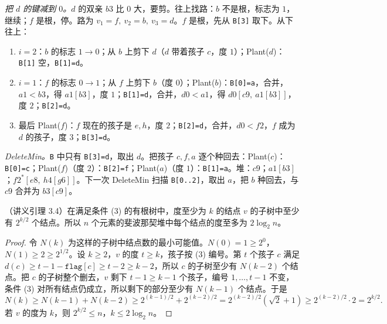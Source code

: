 \begin{example}
\emph{把 $d$ 的键减到 $0$。}$d$ 的双亲 $b3$ 比 $0$ 大，要剪。往上找路：$b$ 不是根，标志为 $1$，继续；$f$ 是根，停。路为 $v_1=f,\ v_2=b,\ v_3=d$。$f$ 是根，先从 \texttt{B[3]} 取下。从下往上：
\begin{enumerate}
\item $i=2$：$b$ 的标志 $1\to0$；从 $b$ 上剪下 $d$（$d$ 带着孩子 $c$，度 $1$）；Plant($d$)：\texttt{B[1]} 空，\texttt{B[1]=d}。
\item $i=1$：$f$ 的标志 $0\to1$；从 $f$ 上剪下 $b$（度 $0$）；Plant($b$)：\texttt{B[0]=a}，合并，$a1<b3$，得 $a1[b3]$，度 $1$；\texttt{B[1]=d}，合并，$d0<a1$，得 $d0[c9,\ a1[b3]]$，度 $2$；\texttt{B[2]=d}。
\item 最后 Plant($f$)：$f$ 现在的孩子是 $e,h$，度 $2$；\texttt{B[2]=d}，合并，$d0<f2$，$f$ 成为 $d$ 的孩子，度 $3$；\texttt{B[3]=d}。
\end{enumerate}
\begin{center}
\end{center}

\emph{DeleteMin。}\texttt{B} 中只有 \texttt{B[3]=d}，取出 $d$。把孩子 $c,f,a$ 逐个种回去：Plant($c$)：\texttt{B[0]=c}；Plant($f$)（度 $2$）：\texttt{B[2]=f}；Plant($a$)（度 $1$）：\texttt{B[1]=a}。堆：$c9$；$a1[b3]$；$f2^*[e8,\ h4[g6]]$。下一次 DeleteMin 扫描 \texttt{B[0..2]}，取出 $a$，把 $b$ 种回去，与 $c9$ 合并为 $b3[c9]$。
\end{example}


\begin{lemma}[度数引理]\label{lem:mst-prim:degree}
（讲义引理 3.4）在满足条件 (3) 的有根树中，度至少为 $k$ 的结点 $v$ 的子树中至少有 $2^{k/2}$ 个结点。所以 $n$ 个元素的斐波那契堆中每个结点的度至多为 $2\log_2n$。
\end{lemma}
\begin{proof}
令 $N(k)$ 为这样的子树中结点数的最小可能值。$N(0)=1\geqslant2^0$，$N(1)\geqslant2\geqslant2^{1/2}$。设 $k\geqslant2$，$v$ 的度 $t\geqslant k$，孩子按 (3) 编号。第 $t$ 个孩子 $c$ 满足 $d(c)\geqslant t-1-\texttt{flag}[c]\geqslant t-2\geqslant k-2$，所以 $c$ 的子树至少有 $N(k-2)$ 个结点。把 $c$ 的子树整个删去，$v$ 剩下 $t-1\geqslant k-1$ 个孩子，编号 $1,\dots,t-1$ 不变，条件 (3) 对所有结点仍成立，所以剩下的部分至少有 $N(k-1)$ 个结点。于是
\[
N(k)\geqslant N(k-1)+N(k-2)\geqslant2^{(k-1)/2}+2^{(k-2)/2}=2^{(k-2)/2}(\sqrt2+1)\geqslant2^{(k-2)/2}\cdot2=2^{k/2}.
\]
若 $v$ 的度为 $k$，则 $2^{k/2}\leqslant n$，$k\leqslant2\log_2n$。
\end{proof}

